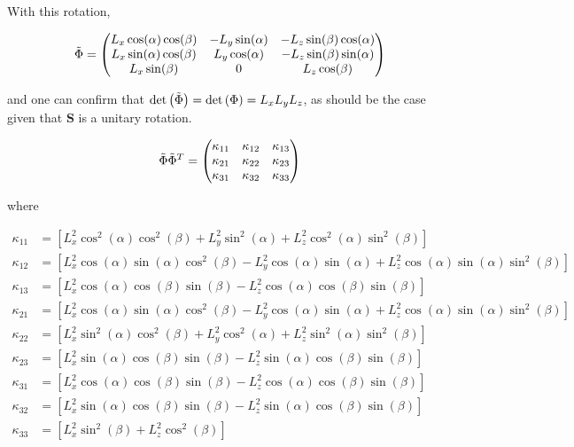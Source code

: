 \documentclass[alpha-refs]{qjrms/wiley-article}
\newcommand{\ca}{\ensuremath{\cos(\alpha)}}
\newcommand{\cb}{\ensuremath{\cos(\beta)}}
\newcommand{\cat}{\ensuremath{\cos^2(\alpha)}}
\newcommand{\cbt}{\ensuremath{\cos^2(\beta)}}
\newcommand{\sia}{\ensuremath{\sin(\alpha)}}
\newcommand{\sib}{\ensuremath{\sin(\beta)}}
\newcommand{\siat}{\ensuremath{\sin^2(\alpha)}}
\newcommand{\sibt}{\ensuremath{\sin^2(\beta)}}
\begin{document}
With this rotation,
\begin{linenomath*}\begin{equation*}
    \tilde{\defjac} =
        \begin{pmatrix}
            L_x \ca\cb & -L_y\sia & -L_z \sib \ca \\
            L_x \sia\cb & L_y \ca & -L_z \sib \sia \\
            L_x \sib & 0 & L_z \cb \\
        \end{pmatrix}
\end{equation*}\end{linenomath*}
and one can confirm that $\text{det}\left(\tilde{\Phi}\right) =
\text{det}\left(\Phi\right) = L_x L_y L_z$, as should be the case given that
$\mathbf{S}$ is a unitary rotation.
\begin{linenomath*}\begin{equation*}
    \tilde{\Phi}\tilde{\Phi}^T =
        \begin{pmatrix}
            \kappa_{11} & \kappa_{12} & \kappa_{13} \\
            \kappa_{21} & \kappa_{22} & \kappa_{23} \\
            \kappa_{31} & \kappa_{32} & \kappa_{33} \\


        \end{pmatrix}
\end{equation*}\end{linenomath*}
where
\begin{linenomath*}\begin{equation*}
    \begin{aligned}
        \kappa_{11} &=
            \left[L_x^2\cat\cbt + L_y^2\siat + L_z^2\cat \sibt \right] \\
        \kappa_{12} &=
            \left[L_x^2\ca\sia\cbt - L_y^2\ca\sia + L_z^2\ca\sia\sibt \right] \\
        \kappa_{13} &=
            \left[L_x^2\ca\cb\sib - L_z^2\ca\cb\sib \right] \\
%
        \kappa_{21} &=
            \left[L_x^2\ca\sia\cbt - L_y^2 \ca\sia + L_z^2 \ca\sia\sibt \right] \\
        \kappa_{22} &=
            \left[L_x^2\siat\cbt + L_y^2\cat + L_z^2\siat \sibt\right] \\
        \kappa_{23} &=
            \left[L_x^2\sia\cb\sib - L_z^2\sia\cb\sib \right] \\
%
        \kappa_{31} &=
            \left[L_x^2\ca\cb\sib - L_z^2\ca\cb\sib \right] \\
        \kappa_{32} &=
            \left[L_x^2\sia\cb\sib - L_z^2\sia\cb\sib \right] \\
        \kappa_{33} &=
            \left[L_x^2\sibt + L_z^2\cbt\right] \\
    \end{aligned}
\end{equation*}\end{linenomath*}
\end{document}
